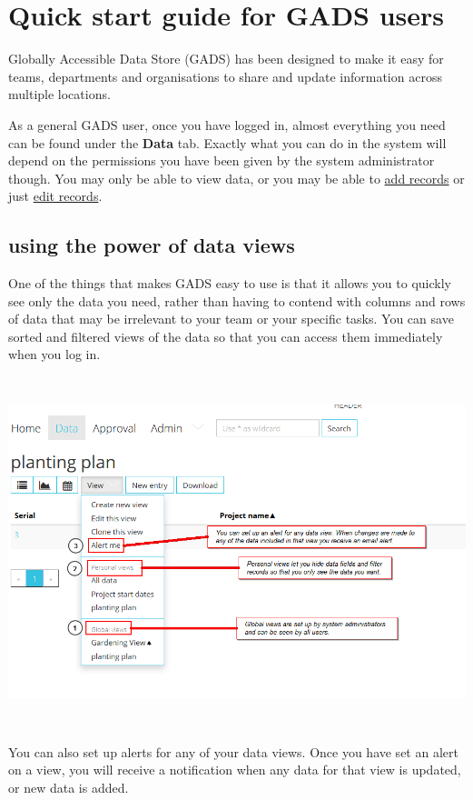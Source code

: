\documentclass{ctrlo-int-toc}
\begin{document}
\clearpage\section{Quick start guide for GADS users}
\label{sec:quickstart}
Globally Accessible Data Store (GADS) has been designed to make it easy for teams, departments and organisations to share and update information across multiple locations. 

As a general GADS user, once you have logged in, almost everything you need can be found under the \textbf{Data} tab. Exactly what you can do in the system will depend on the permissions you have been given by the system administrator though. You may only be able to view data, or you may be able to \hyperref[subsec:addrecord]{add records} or just \hyperref[subsec:editrecord]{edit records}. 

\subsection{using the power of data views}
One of the things that makes GADS easy to use is that it allows you to quickly see only the data you need, rather than having to contend with columns and rows of data that may be irrelevant to your team or your specific tasks. You can save sorted and filtered views of the data so that you can access them immediately when you log in. 

\includegraphics[width=15.921cm,height=10.188cm]{userguide-img/userguide-img001.png}


You can also set up alerts for any of your data views. Once you have set an alert on a view, you will receive a notification when any data for that view is updated, or new data is added.
\end{document}

